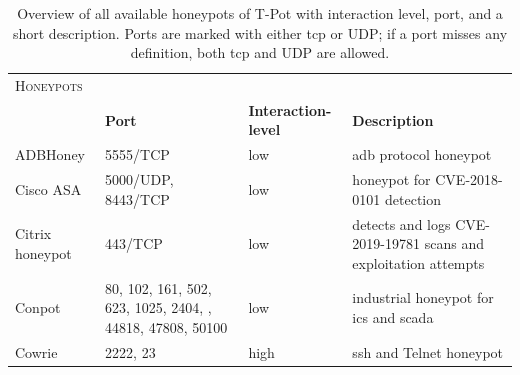 \begin{table}
    \centering
    \caption[Overview of honeypots of T-Pot]{
        Overview of all available honeypots of T-Pot with interaction level, port, and a short description.
        Ports are marked with either \ac{tcp} or UDP; if a port misses any definition, both \ac{tcp} and UDP are allowed.
    }
    \begin{tabularx}{\linewidth}{l|XlX}
        \toprule
        \textsc{Honeypots}                        & \multicolumn{3}{c}{}                                                                                                                                                                                                            \\
                                                  & \textbf{Port}                                                                                               & \textbf{Interaction-level} & \textbf{Description}                                                                 \\
        \hline
        ADBHoney \cite{adbhoney2021}              & 5555/TCP                                                                                                    & low                        & \ac{adb} protocol honeypot                                                           \\
        Cisco ASA \cite{cymmetria2018}            & 5000/UDP, 8443/TCP                                                                                          & low                        & honeypot for CVE-2018-0101\cite{CVE-2018-0101} detection                             \\
        Citrix honeypot \cite{citrixhoneypot2020} & 443/TCP                                                                                                     & low                        & detects and logs CVE-2019-19781\cite{CVE-2019-19781} scans and exploitation attempts \\
        Conpot \cite{conpot2021}                  & 80, 102, 161, 502, 623, 1025, 2404, \newline 10001, 44818, 47808, 50100                                     & low                        & industrial honeypot for \ac{ics} and \ac{scada}                                      \\
        Cowrie \cite{cowrie2021}                  & 2222, 23                                                                                                    & high                       & \ac{ssh} and Telnet honeypot                                                         \\

\end{tabularx}
\end{table}
